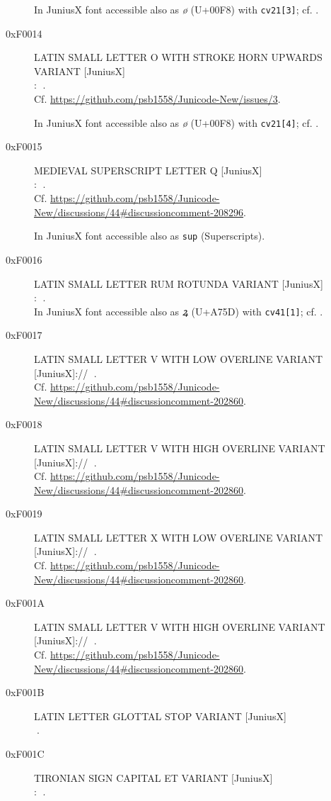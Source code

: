 \documentclass{article}
\newcommand{\Jglyph}[1]{{\relsize{2}\J#1}}
\begin{document}
\begin{description}
  In JuniusX font accessible also as \textit{ø} (U+00F8) with \texttt{cv21[3]};
  cf. \autocite[p. 9]{baker20:_opent_featur_junius_junius}.
\item [0xF0014] LATIN SMALL LETTER O WITH STROKE HORN UPWARDS VARIANT [JuniusX]\\:
  \Jglyph{󰀓}.\\  Cf. \url{https://github.com/psb1558/Junicode-New/issues/3}.

  In JuniusX font accessible also as \textit{ø} (U+00F8) with \texttt{cv21[4]};
  cf. \autocite[p. 9]{baker20:_opent_featur_junius_junius}.
\item [0xF0015] MEDIEVAL SUPERSCRIPT LETTER Q [JuniusX]\\:
  \Jglyph{󰀕}.\\
  Cf. \url{https://github.com/psb1558/Junicode-New/discussions/44#discussioncomment-208296}.

  In JuniusX font accessible also as \texttt{sup} (Superscripts).

\item [0xF0016] LATIN SMALL LETTER RUM ROTUNDA VARIANT [JuniusX]\\:
  \Jglyph{󰀖}.\\%

  In JuniusX font accessible also as \textit{ꝝ} (U+A75D) with \texttt{cv41[1]};
  cf. \autocite[p. 12]{baker20:_opent_featur_junius_junius}.
\item [0xF0017] LATIN SMALL LETTER V WITH LOW OVERLINE VARIANT [JuniusX]:// 
  \Jglyph{󰀗}.\\ Cf. \url{https://github.com/psb1558/Junicode-New/discussions/44#discussioncomment-202860}.
\item [0xF0018] LATIN SMALL LETTER V WITH HIGH OVERLINE VARIANT [JuniusX]:// 
  \Jglyph{󰀘}.\\ Cf. \url{https://github.com/psb1558/Junicode-New/discussions/44#discussioncomment-202860}.
\item [0xF0019] LATIN SMALL LETTER X WITH LOW OVERLINE VARIANT [JuniusX]:// 
  \Jglyph{󰀙}.\\ Cf. \url{https://github.com/psb1558/Junicode-New/discussions/44#discussioncomment-202860}.
\item [0xF001A] LATIN SMALL LETTER V WITH HIGH OVERLINE VARIANT [JuniusX]:// 
  \Jglyph{󰀚}.\\ Cf. \url{https://github.com/psb1558/Junicode-New/discussions/44#discussioncomment-202860}.
\item [0xF001B] LATIN LETTER GLOTTAL STOP VARIANT [JuniusX]\\
  \Jglyph{󰀛}.\\%
\item [0xF001C] TIRONIAN SIGN CAPITAL ET VARIANT [JuniusX]\\:
\Jglyph{󰀜}.%


\end{description}
\end{document}
